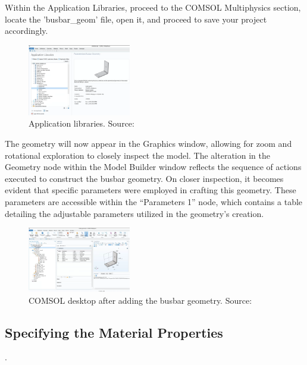 Within the Application Libraries, proceed to the COMSOL Multiphysics section, locate the 'busbar\_geom' file, open it, and proceed to save your project accordingly.

\begin{figure}[ht!]
  \centering
  \includegraphics[width=0.4\textwidth]{Chapters/Figures/Chapter 3 Figures/Application Libraries.png}
  \caption{Application libraries. Source: \cite{multiphysics__modeling_nodate}}
  \label{fig:Application libraries}
\end{figure}

The geometry will now appear in the Graphics window, allowing for zoom and rotational exploration to closely inspect the model. The alteration in the Geometry node within the Model Builder window reflects the sequence of actions executed to construct the busbar geometry. On closer inspection, it becomes evident that specific parameters were employed in crafting this geometry. These parameters are accessible within the ``Parameters 1'' node, which contains a table detailing the adjustable parameters utilized in the geometry's creation.

\begin{figure}[ht!]
  \centering
  \includegraphics[width=0.4\textwidth]{Chapters/Figures/Chapter 3 Figures/Initial Busbar Geom.png}
  \caption{COMSOL desktop after adding the busbar geometry. Source: \cite{multiphysics__modeling_nodate}}
  \label{fig:COMSOL desktop after busbar geometry}
\end{figure}

\subsection{Specifying the Material Properties}.

